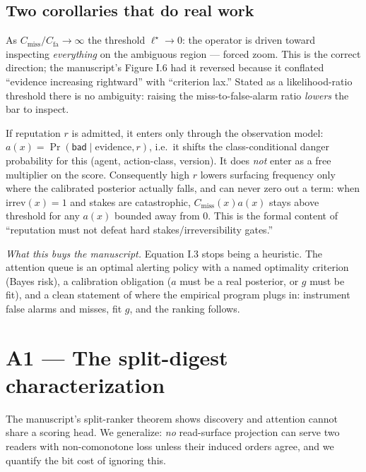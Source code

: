 \documentclass[11pt,a4paper]{article}
\begin{document}
\subsection{Two corollaries that do real work}
\begin{claim}
As $C_\text{miss}/C_\text{fa}\to\infty$ the threshold $\ell^\star\to 0$: the operator is driven toward inspecting \emph{everything} on the ambiguous region --- forced zoom. This is the correct direction; the manuscript's Figure I.6 had it reversed because it conflated ``evidence increasing rightward'' with ``criterion lax.'' Stated as a likelihood-ratio threshold there is no ambiguity: raising the miss-to-false-alarm ratio \emph{lowers} the bar to inspect.
\end{claim}
\begin{claim}
If reputation $r$ is admitted, it enters only through the observation model: $a(x)=\Pr(\mathsf{bad}\mid \text{evidence}, r)$, i.e.\ it shifts the class-conditional danger probability for this (agent, action-class, version). It does \emph{not} enter as a free multiplier on the score. Consequently high $r$ lowers surfacing frequency only where the calibrated posterior actually falls, and can never zero out a term: when $\text{irrev}(x)=1$ and stakes are catastrophic, $C_\text{miss}(x)a(x)$ stays above threshold for any $a(x)$ bounded away from $0$. This is the formal content of ``reputation must not defeat hard stakes/irreversibility gates.''
\end{claim}

\noindent\emph{What this buys the manuscript.} Equation I.3 stops being a heuristic. The attention queue is an optimal alerting policy with a named optimality criterion (Bayes risk), a calibration obligation ($a$ must be a real posterior, or $g$ must be fit), and a clean statement of where the empirical program plugs in: instrument false alarms and misses, fit $g$, and the ranking follows.

\section{A1 --- The split-digest characterization}
The manuscript's split-ranker theorem shows discovery and attention cannot share a scoring head. We generalize: \emph{no} read-surface projection can serve two readers with non-comonotone loss unless their induced orders agree, and we quantify the bit cost of ignoring this.
\end{document}
